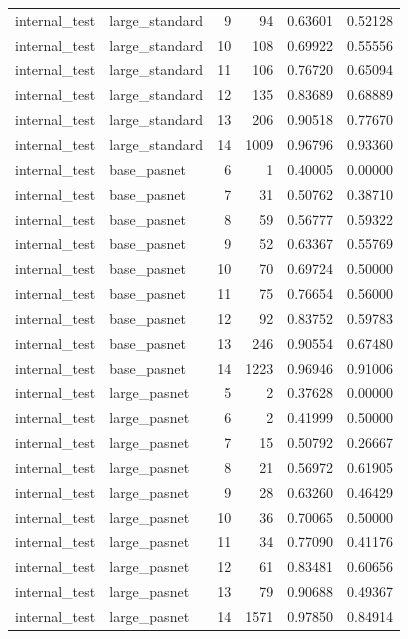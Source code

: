 \begin{tabular}{llrrrr}
internal\_test & large\_standard & 9 & 94 & 0.63601 & 0.52128 \\
internal\_test & large\_standard & 10 & 108 & 0.69922 & 0.55556 \\
internal\_test & large\_standard & 11 & 106 & 0.76720 & 0.65094 \\
internal\_test & large\_standard & 12 & 135 & 0.83689 & 0.68889 \\
internal\_test & large\_standard & 13 & 206 & 0.90518 & 0.77670 \\
internal\_test & large\_standard & 14 & 1009 & 0.96796 & 0.93360 \\
internal\_test & base\_pasnet & 6 & 1 & 0.40005 & 0.00000 \\
internal\_test & base\_pasnet & 7 & 31 & 0.50762 & 0.38710 \\
internal\_test & base\_pasnet & 8 & 59 & 0.56777 & 0.59322 \\
internal\_test & base\_pasnet & 9 & 52 & 0.63367 & 0.55769 \\
internal\_test & base\_pasnet & 10 & 70 & 0.69724 & 0.50000 \\
internal\_test & base\_pasnet & 11 & 75 & 0.76654 & 0.56000 \\
internal\_test & base\_pasnet & 12 & 92 & 0.83752 & 0.59783 \\
internal\_test & base\_pasnet & 13 & 246 & 0.90554 & 0.67480 \\
internal\_test & base\_pasnet & 14 & 1223 & 0.96946 & 0.91006 \\
internal\_test & large\_pasnet & 5 & 2 & 0.37628 & 0.00000 \\
internal\_test & large\_pasnet & 6 & 2 & 0.41999 & 0.50000 \\
internal\_test & large\_pasnet & 7 & 15 & 0.50792 & 0.26667 \\
internal\_test & large\_pasnet & 8 & 21 & 0.56972 & 0.61905 \\
internal\_test & large\_pasnet & 9 & 28 & 0.63260 & 0.46429 \\
internal\_test & large\_pasnet & 10 & 36 & 0.70065 & 0.50000 \\
internal\_test & large\_pasnet & 11 & 34 & 0.77090 & 0.41176 \\
internal\_test & large\_pasnet & 12 & 61 & 0.83481 & 0.60656 \\
internal\_test & large\_pasnet & 13 & 79 & 0.90688 & 0.49367 \\
internal\_test & large\_pasnet & 14 & 1571 & 0.97850 & 0.84914 \\

\end{tabular}
